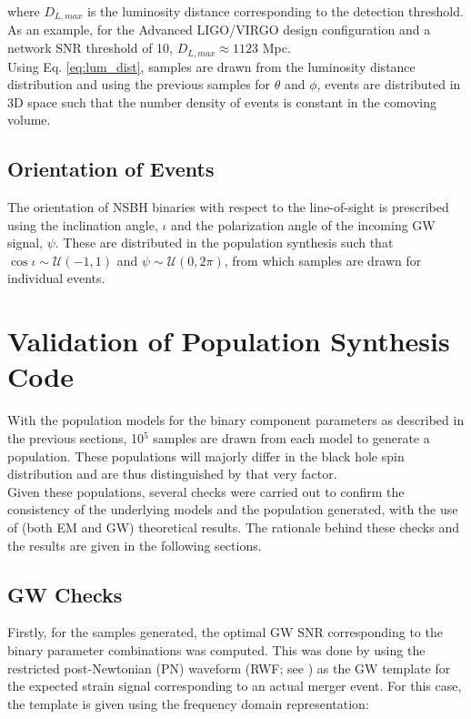         where $D_{L, max}$ is the luminosity distance corresponding to the detection
        threshold. As an example, for the Advanced LIGO/VIRGO design configuration and a
        network SNR threshold of 10, $D_{L, max} \approx 1123$ Mpc.\\
        Using Eq. \ref{eq:lum_dist}, samples are drawn from the luminosity distance
        distribution and using the previous samples for $\theta$ and $\phi$, events are
        distributed in 3D space such that the number density of events is constant in
        the comoving volume.

    \subsection{Orientation of Events}\label{sub:orientation_of_events}

        The orientation of NSBH binaries with respect to the line-of-sight is prescribed
        using the inclination angle, $\iota$ and the polarization angle of the incoming
        GW signal, $\psi$. These are distributed in the population synthesis such that
        $\cos\iota \sim \mathcal{U}(-1, 1)$ and $\psi \sim \mathcal{U}(0, 2\pi)$, from
        which samples are drawn for individual events.

\section{Validation of Population Synthesis Code}\label{sec:popsyn_validation}

    With the population models for the binary component parameters as described in the
    previous sections, 10$^5$ samples are drawn from each model to generate a
    population.  These populations will majorly differ in the black hole spin
    distribution and are thus distinguished by that very factor.\\
    Given these populations, several checks were carried out to confirm the consistency
    of the underlying models and the population generated, with the use of (both EM and
    GW) theoretical results. The rationale behind these checks and the results are given
    in the following sections.

    \subsection{GW Checks}\label{sub:gw_checks}

        Firstly, for the samples generated, the optimal GW SNR corresponding to the
        binary parameter combinations was computed. This was done by using the
        restricted post-Newtonian (PN) waveform (RWF; see \cite{cutler_1994}) as the GW
        template for the expected strain signal corresponding to an actual merger event.
        For this case, the template is given using the frequency domain representation:

